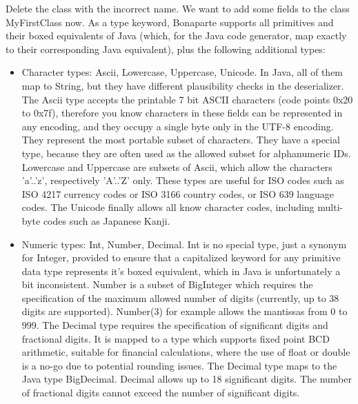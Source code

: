\documentclass[11pt,a4paper,oneside]{article}
\begin{document}
Delete the class with the incorrect name. We want to add some fields to the class {\ttfamily MyFirstClass} now. As a type keyword, Bonaparte supports all
primitives and their boxed equivalents of Java (which, for the Java code generator, map exactly to their corresponding Java equivalent), plus the following additional types:
 
\begin{itemize}
  \item Character types:  {\ttfamily Ascii}, {\ttfamily Lowercase}, {\ttfamily Uppercase}, {\ttfamily Unicode}. In Java, all of them map to {\ttfamily String},
   but they have different plausibility checks in the deserializer. The {\ttfamily Ascii} type accepts the printable 7 bit ASCII characters
    (code points 0x20 to 0x7f), therefore you know characters in these fields can be represented in any encoding, and they occupy a single byte only in the
     UTF-8 encoding. They represent the most portable subset of characters. They have a special type, because they are often used as the allowed subset for
      alphanumeric IDs. {\ttfamily Lowercase} and {\ttfamily Uppercase} are subsets of {\ttfamily Ascii}, which allow the characters {\ttfamily 'a'..'z'},
      respectively {\ttfamily 'A'..'Z'} only. These types are useful for ISO codes such as ISO 4217 currency codes or ISO 3166
      country codes, or ISO 639 language codes.  The {\ttfamily Unicode} finally allows all know character codes, including multi-byte codes such as Japanese Kanji.
  \item Numeric types: {\ttfamily Int}, {\ttfamily Number}, {\ttfamily Decimal}.  {\ttfamily Int} is no special type, just a synonym for {\ttfamily Integer},
      provided to ensure that a capitalized keyword for any primitive data type represents it's boxed equivalent, which in Java is unfortunately a bit inconsistent.
      {\ttfamily Number} is a subset of {\ttfamily BigInteger} which requires the specification of the maximum allowed number of
      digits (currently, up to 38 digits are supported). {\ttfamily Number(3)} for example allows the mantissas from 0 to 999.
      The {\ttfamily Decimal} type requires the specification of significant digits and fractional digits. It is mapped to a type which supports fixed point BCD arithmetic, suitable for
      financial calculations, where the use of {\ttfamily float} or {\ttfamily double} is a no-go due to potential rounding issues. The {\ttfamily Decimal} type
      maps to the Java type BigDecimal. {\ttfamily Decimal} allows up to 18 significant digits. The number of fractional digits cannot exceed the number of significant digits.

\end{itemize}
\end{document}
